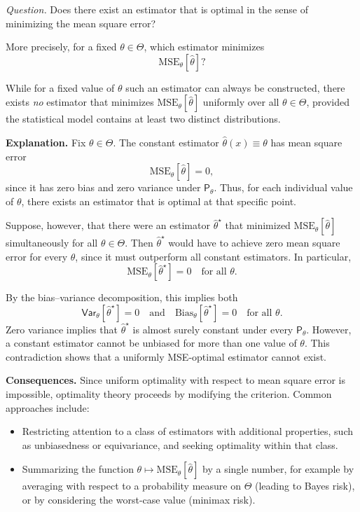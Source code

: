\label{par:optimality_mse}

\emph{Question.}  
Does there exist an estimator that is optimal in the sense of minimizing the mean square error?

More precisely, for a fixed $\theta \in \Theta$, which estimator minimizes
\[
\text{MSE}_{\theta}[\hat{\theta}]?
\]

While for a fixed value of $\theta$ such an estimator can always be constructed, there exists \emph{no} estimator that minimizes $\text{MSE}_{\theta}[\hat{\theta}]$ uniformly over all $\theta \in \Theta$, provided the statistical model contains at least two distinct distributions.

\medskip
\noindent
\textbf{Explanation.}
Fix $\theta \in \Theta$.  
The constant estimator $\hat{\theta}(x) \equiv \theta$ has mean square error
\[
\text{MSE}_{\theta}[\hat{\theta}] = 0,
\]
since it has zero bias and zero variance under $\mathsf{P}_{\theta}$.
Thus, for each individual value of $\theta$, there exists an estimator that is optimal at that specific point.

Suppose, however, that there were an estimator $\hat{\theta}^\star$ that minimized $\text{MSE}_{\theta}[\hat{\theta}]$ simultaneously for all $\theta \in \Theta$.
Then $\hat{\theta}^\star$ would have to achieve zero mean square error for every $\theta$, since it must outperform all constant estimators.
In particular,
\[
\text{MSE}_{\theta}[\hat{\theta}^\star] = 0
\quad \text{for all } \theta.
\]

By the bias--variance decomposition, this implies both
\[
\mathsf{Var}_{\theta}[\hat{\theta}^\star] = 0
\quad \text{and} \quad
\text{Bias}_{\theta}[\hat{\theta}^\star] = 0
\quad \text{for all } \theta.
\]
Zero variance implies that $\hat{\theta}^\star$ is almost surely constant under every $\mathsf{P}_{\theta}$.
However, a constant estimator cannot be unbiased for more than one value of $\theta$.
This contradiction shows that a uniformly MSE-optimal estimator cannot exist.

\medskip
\noindent
\textbf{Consequences.}
Since uniform optimality with respect to mean square error is impossible, optimality theory proceeds by modifying the criterion. Common approaches include:
\begin{itemize}
    \item Restricting attention to a class of estimators with additional properties, such as unbiasedness or equivariance, and seeking optimality within that class.
    \item Summarizing the function $\theta \mapsto \text{MSE}_{\theta}[\hat{\theta}]$ by a single number, for example by averaging with respect to a probability measure on $\Theta$ (leading to Bayes risk), or by considering the worst-case value (minimax risk).
\end{itemize}

